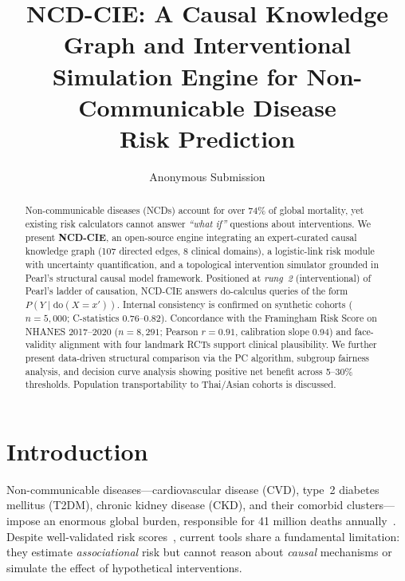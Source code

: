 \documentclass[runningheads]{llncs}
\begin{document}
\title{NCD-CIE: A Causal Knowledge Graph and Interventional\\Simulation Engine for Non-Communicable Disease\\Risk Prediction}

\author{Anonymous Submission}

\maketitle

\begin{abstract}
Non-communicable diseases (NCDs) account for over 74\% of global
mortality, yet existing risk calculators cannot answer \emph{``what
if''} questions about interventions.  We present \textbf{NCD-CIE}, an
open-source engine integrating an expert-curated causal knowledge
graph (107 directed edges, 8 clinical domains), a logistic-link risk
module with uncertainty quantification, and a topological intervention
simulator grounded in Pearl's structural causal model framework.
Positioned at \emph{rung~2} (interventional) of Pearl's ladder of
causation, NCD-CIE answers do-calculus queries of the form
$P(Y \mid \mathrm{do}(X\!=\!x'))$.  Internal consistency is confirmed
on synthetic cohorts ($n\!=\!5{,}000$; C-statistics 0.76--0.82).
Concordance with the Framingham Risk Score on NHANES 2017--2020
($n\!=\!8{,}291$; Pearson $r\!=\!0.91$, calibration slope 0.94)
and face-validity alignment with four landmark RCTs support clinical
plausibility.  We further present data-driven structural comparison
via the PC algorithm, subgroup fairness analysis, and decision curve
analysis showing positive net benefit across 5--30\% thresholds.
Population transportability to Thai/Asian cohorts is discussed.

\end{abstract}

\section{Introduction}\label{sec:intro}

Non-communicable diseases---cardiovascular disease (CVD), type~2
diabetes mellitus (T2DM), chronic kidney disease (CKD), and their
comorbid clusters---impose an enormous global burden, responsible for
41 million deaths annually~\cite{who2021ncd}.  Despite well-validated
risk scores~\cite{dagostino2008framingham, hippisley2017qrisk3,
score22021}, current tools share a fundamental limitation: they
estimate \emph{associational} risk but cannot reason about
\emph{causal} mechanisms or simulate the effect of hypothetical
interventions.
\end{document}
